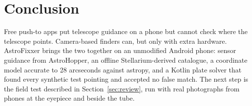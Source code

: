 \section{Conclusion}
\label{sec:conclusion}

Free push-to apps put telescope guidance on a phone but cannot check where the telescope points. Camera-based finders can, but only with extra hardware. AstroFixxer brings the two together on an unmodified Android phone: sensor guidance from AstroHopper, an offline Stellarium-derived catalogue, a coordinate model accurate to 28 arcseconds against astropy, and a Kotlin plate solver that found every synthetic test pointing and accepted no false match. The next step is the field test described in Section~\ref{sec:review}, run with real photographs from phones at the eyepiece and beside the tube.
